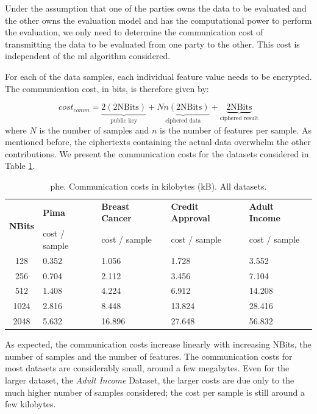Under the assumption that one of the parties owns the data to be evaluated and the other owns the evaluation model and has the computational power to perform the evaluation, we only need to determine the communication cost of transmitting the data to be evaluated from one party to the other. This cost is independent of the \ac{ml} algorithm considered.

For each of the data samples, each individual feature value needs to be encrypted. The communication cost, in bits, is therefore given by:

\begin{equation}
\label{eq:PHE_commCost}
cost_{comm} = \underbrace{2(2\text{NBits})}_{\text{public key}} + \underbrace{Nn(2\text{NBits})}_{\text{ciphered data}} + \underbrace{2\text{NBits}}_{\text{ciphered result}} 
\end{equation}
where $N$ is the number of samples and $n$ is the number of features per sample. As mentioned before, the ciphertexts containing the actual data overwhelm the other contributions. We present the communication costs for the datasets considered in Table \ref{table:PHECommCost}.

\begin{table}[htp]
\centering
\caption{\acs{phe}. Communication costs in kilobytes (kB). All datasets.}
\label{table:PHECommCost}
\begin{tabular}{|c|l|l|l|l|}
\hline
\multirow{2}{*}{\textbf{NBits}} & \textbf{Pima}          & \textbf{Breast Cancer} & \textbf{Credit Approval} & \textbf{Adult Income}   \\ \cline{2-5}
                       & cost / sample & cost / sample & cost / sample   & cost / sample  \\ \hline
128       & 0.352        & 1.056          & 1.728          & 3.552         \\ \hline
256       & 0.704        & 2.112          & 3.456          & 7.104         \\ \hline
512       & 1.408        & 4.224          & 6.912          & 14.208        \\ \hline
1024      & 2.816        & 8.448          & 13.824         & 28.416        \\ \hline
2048      & 5.632        & 16.896         & 27.648         & 56.832        \\ \hline
\end{tabular}
\end{table}


As expected, the communication costs increase linearly with increasing NBits, the number of samples and the number of features. The communication costs for most datasets are considerably small, around a few megabytes. Even for the larger dataset, the \emph{Adult Income} Dataset, the larger costs are due only to the much higher number of samples considered; the cost per sample is still around a few kilobytes.



